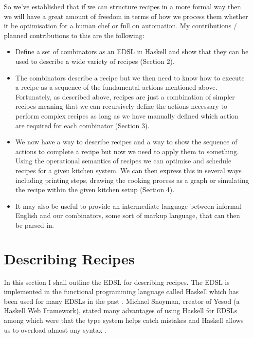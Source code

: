 \documentclass[11pt]{article}
\begin{document}
    So we've established that if we can structure recipes in a more
    formal way then we will have a great amount of freedom in terms
    of how we process them whether it be optimisation for a human
    chef or full on automation. My contributions / planned contributions
    to this are the following:

    \begin{itemize}
        \item Define a set of combinators as an EDSL in Haskell and show that
        they can be used to describe a wide variety of recipes (Section 2).

        \item The combinators describe a recipe but we then need to know
        how to execute a recipe as a sequence of the fundamental actions
        mentioned above. Fortunately, as described above, recipes are just
        a combination of simpler recipes meaning that we can recursively
        define the actions necessary to perform complex recipes as long
        as we have manually defined which action are required for each
        combinator (Section 3).

        \item We now have a way to describe recipes and a way to show the
        sequence of actions to complete a recipe but now we need to apply
        them to something. Using the operational semantics of recipes
        we can optimise and schedule recipes for a given kitchen system.
        We can then express this in several ways including printing steps,
        drawing the cooking process as a graph or simulating the recipe
        within the given kitchen setup (Section 4).

        \item It may also be useful to provide an intermediate language
        between informal English and our combinators, some sort of markup
        language, that can then be parsed in.
    \end{itemize}

    \section{Describing Recipes}
    In this section I shall outline the EDSL for describing recipes.
    The EDSL is implemented in the functional programming language
    called Haskell which has been used for many EDSLs in the past \cite{hudak}.
    Michael Snoyman, creator of Yesod (a Haskell Web Framework), stated
    many advantages of using Haskell for EDSLs among which were that
    the type system helps catch mistakes and Haskell allows us to
    overload almost any syntax \cite{snoyman}.
\end{document}
